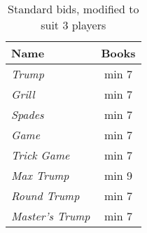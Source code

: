 \begin{table}
	\begin{center}
		\begin{tabular}{ l | c }
				\textbf{Name} & \textbf{Books}
				\\ \hline
				\textit{Trump} & min 7 \\
				\textit{Grill} & min 7 \\
				\textit{Spades} & min 7 \\
				\textit{Game} & min 7 \\
				\textit{Trick Game} & min 7 \\
				\textit{Max Trump} & min 9 \\
				\textit{Round Trump} & min 7 \\
				\textit{Master's Trump} & min 7
		\end{tabular}
	\end{center}
	\caption{Standard bids, modified to suit 3 players}
	\label{tab:standardBids3}
\end{table}
